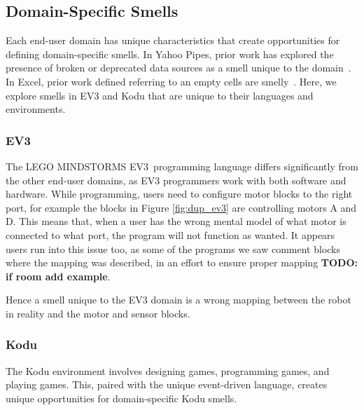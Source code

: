 \documentclass{sig-alternate}
\newcommand{\todo}[1]{\textbf{TODO: #1}}
\newcommand{\ms}{LEGO MINDSTORMS EV3}
\begin{document}
\subsection{Domain-Specific Smells}
Each end-user domain has unique characteristics that create opportunities for defining domain-specific smells. In Yahoo Pipes, prior work has explored the presence of broken or deprecated data sources as a smell unique to the domain~\cite{StoleeTSE2013}. In Excel, prior work defined referring to an empty cells are smelly~\cite{cunha2012towards}. Here, we explore smells in EV3 and Kodu that are unique to their languages and environments. 

\subsubsection{EV3}
The \ms~programming language differs significantly from the other end-user domains, as EV3 programmers work with both software and hardware. While programming, users need to configure motor blocks to the right port, for example the blocks in Figure \ref{fig:dup_ev3} are controlling motors A and D. This means that, when a user has the wrong mental model of what motor is connected to what port, the program will not function as wanted. It appears users run into this issue too, as some of the programs we saw comment blocks where the mapping was described, in an effort to ensure proper mapping \todo{if room add example}.

Hence a smell unique to the EV3 domain is a wrong mapping between the robot in reality and the motor and sensor blocks. 


\subsubsection{Kodu}
The Kodu environment involves designing games, programming games, and playing games. This, paired with the unique event-driven language, creates unique opportunities for domain-specific Kodu smells. 

% 
\end{document}
